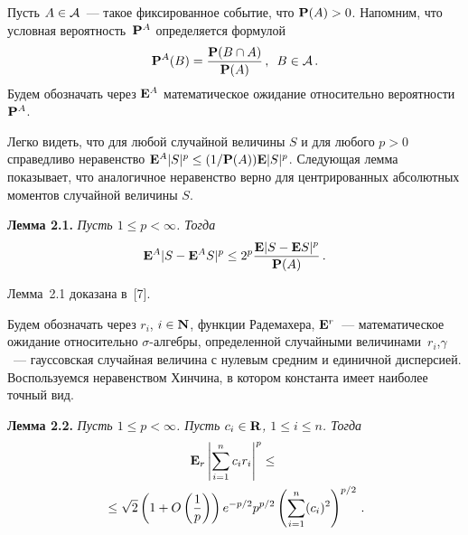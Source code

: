 \begin{multicols}{2}
Пусть  $A\in\AD$~--- такое фиксированное событие, что $\P(A)>0$.
Напомним, что условная вероятность~${\P^A}$ определяется формулой
 $$
 \P^A(B)=\fr{\P(B\cap A)}{\P(A)}\,,\enskip  B \in\AD\,.
 $$
Будем обозначать через ${\E}^A$  математическое ожидание
относительно вероятности $\P^A$.

Легко видеть, что для любой случайной величины $S$ и  для любого
 $p>0$ справедливо неравенство ${\E}^A|S|^p\le (1/\P(A)){\E}|S|^p$.
 Следующая лемма показывает, что аналогичное неравенство верно для
центрированных абсолютных моментов случайной величины $S$.

\medskip

\noindent
\textbf{Лемма 2.1.} {\it Пусть $1\le  p<\infty$. Тогда
\begin{equation}
 {\E}^A|S-{\E}^AS|^p   \le  2^p\fr{{\E}|S-{\E}S|^p}{{\P}(A)}\,.
\label{e2.1faz}
\end{equation}}

\medskip

Лемма~2.1 доказана в~[7].

\medskip

Будем обозначать через $r_i$, $i\in\N$,  функции Радемахера, $\E^r$~--- 
математическое ожидание относительно $\sigma$-алгебры,
определенной случайными величинами~$r_i$,$\gamma$~--- гауссовская
случайная величина с нулевым средним и единичной дисперсией.
Воспользуемся  неравенством Хинчина, в котором константа имеет
наиболее точный вид.

\medskip

\noindent
\textbf{Лемма 2.2.} {\it Пусть $1\le p<\infty$. Пусть $c_i\in{\bf R}$,
$1\le i\le n$. Тогда
\begin{multline}
{\E_r}\left|\sum\limits_{i=1}^n c_ir_i\right|^p \le{}\\
{}\le
\sqrt{2}\left(1+O\left(\fr{1}{p}\right)\right)e^{-p/2}
p^{p/2} \left(\sum\limits_{i=1}^n(c_i)^2\right)^{p/2}\,.
\label{e2.2faz}
\end{multline}
}

\medskip


\end{multicols}

